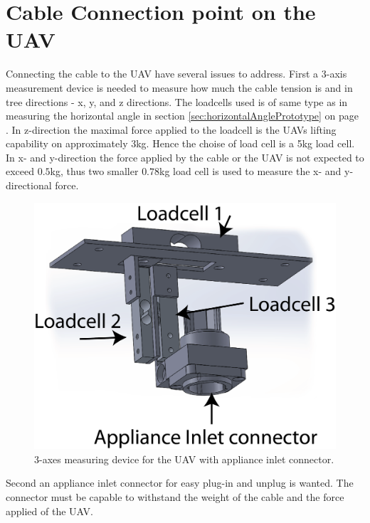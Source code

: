 \section{Cable Connection point on the UAV}
Connecting the cable to the UAV have several issues to address. First a 3-axis measurement device is needed to measure how much the cable tension is and in tree directions - x, y, and z directions. The loadcells used is of same type as in measuring the horizontal angle in section \ref{sec:horizontalAnglePrototype} on page \pageref{sec:horizontalAnglePrototype}. In z-direction the maximal force applied to the loadcell is the UAVs lifting capability on approximately 3kg. Hence the choise of load cell is a 5kg load cell.\\
\noindent
In x- and y-direction the force applied by the cable or the UAV is not expected to exceed $0.5$kg, thus two smaller $0.78$kg load cell is used to measure the x- and y-directional force. 

\begin{figure}[hbtp]
\centering
\includegraphics[scale=0.5]{graphics/cad/hexa.png}
\caption{3-axes measuring device for the UAV with appliance inlet connector.}
\end{figure}


\noindent
Second an appliance inlet connector for easy plug-in and unplug is wanted. The connector must be capable to withstand the weight of the cable and the force applied of the UAV. 

